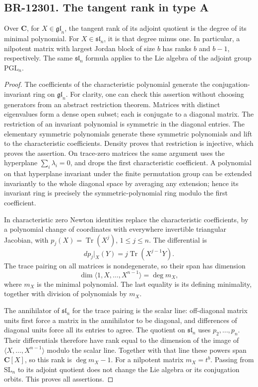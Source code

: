 \subsection{BR-12301. The tangent rank in type A}
Over \(\mathbf C\), for \(X\in\mathfrak{gl}_n\), the tangent
rank of its adjoint quotient is the degree of its minimal
polynomial. For \(X\in\mathfrak{sl}_n\), it is that degree
minus one. In particular, a nilpotent matrix with largest
Jordan block of size \(b\) has ranks \(b\) and \(b-1\),
respectively. The same \(\mathfrak{sl}_n\) formula applies
to the Lie algebra of the adjoint group \(\mathrm{PGL}_n\).

\begin{proof}
The coefficients of the characteristic polynomial generate
the conjugation-invariant ring on \(\mathfrak{gl}_n\).
For clarity, one can check this assertion without choosing
generators from an abstract restriction theorem. Matrices
with distinct eigenvalues form a dense open subset; each is
conjugate to a diagonal matrix. The restriction of an
invariant polynomial is symmetric in the diagonal entries.
The elementary symmetric polynomials generate these symmetric
polynomials and lift to the characteristic coefficients.
Density proves that restriction is injective, which proves
the assertion. On trace-zero matrices the same argument uses
the hyperplane \(\sum_i\lambda_i=0\), and drops the first
characteristic coefficient. A polynomial on that hyperplane
invariant under the finite permutation group can be extended
invariantly to the whole diagonal space by averaging any
extension; hence its invariant ring is precisely the
symmetric-polynomial ring modulo the first coefficient.

In characteristic zero Newton identities replace the
characteristic coefficients, by a polynomial change of
coordinates with everywhere invertible triangular Jacobian,
with \(p_j(X)=\operatorname{Tr}(X^j)\), \(1\leq j\leq n\).
The differential is
\[
 dp_j|_X(Y)=j\operatorname{Tr}(X^{j-1}Y).
\]
The trace pairing on all matrices is nondegenerate, so their
span has dimension
\[
 \dim\langle 1,X,\ldots,X^{n-1}\rangle=\deg m_X,
\]
where \(m_X\) is the minimal polynomial. The last equality
is its defining minimality, together with division of
polynomials by \(m_X\).

The annihilator of \(\mathfrak{sl}_n\) for the trace pairing
is the scalar line: off-diagonal matrix units first force
a matrix in the annihilator to be diagonal, and differences
of diagonal units force all its entries to agree. The
quotient on \(\mathfrak{sl}_n\) uses \(p_2,\ldots,p_n\).
Their differentials therefore have rank equal to the
dimension of the image of \(\langle X,\ldots,X^{n-1}\rangle\)
modulo the scalar line. Together with that line these
powers span \(\mathbf C[X]\), so this rank is
\(\deg m_X-1\). For a nilpotent matrix \(m_X=t^b\).
Passing from \(\mathrm{SL}_n\) to its adjoint quotient
does not change the Lie algebra or its conjugation orbits.
This proves all assertions.
\end{proof}

